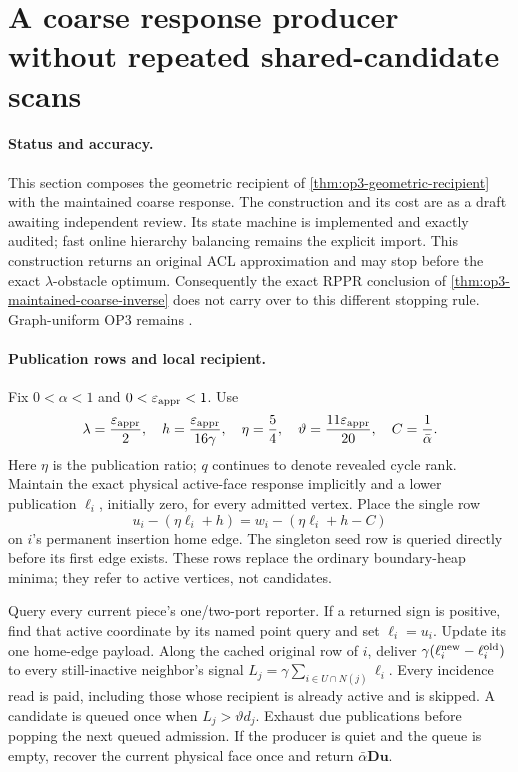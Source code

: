 \section[Coarse publication producer]{A coarse response producer without repeated shared-candidate scans}
\label{sec:op3-coarse-publications}

\paragraph{Status and accuracy.}
This section composes the geometric recipient of
\cref{thm:op3-geometric-recipient} with the maintained coarse response.
The construction and its cost are \statusproved{} as a draft awaiting
independent review. Its state machine is implemented and exactly audited;
fast online hierarchy balancing remains the explicit \statussource{}
import. This construction returns an original ACL approximation and may
stop before the exact $\lambda$-obstacle optimum. Consequently the exact
RPPR conclusion of \cref{thm:op3-maintained-coarse-inverse} does not carry
over to this different stopping rule. Graph-uniform OP3 remains
\statusopen{}.

\paragraph{Publication rows and local recipient.}
Fix $0<\alpha<1$ and $0<\varepsilon_{\mathrm{appr}}<1$. Use
\[
 \lambda=\frac{\varepsilon_{\mathrm{appr}}}{2},\quad
 h=\frac{\varepsilon_{\mathrm{appr}}}{16\gamma},\quad
 \eta=\frac54,\quad
 \vartheta=\frac{11\varepsilon_{\mathrm{appr}}}{20},\quad C=\frac1{\bar\alpha}.
\]
Here $\eta$ is the publication ratio; $q$ continues to denote revealed
cycle rank. Maintain the exact physical active-face response implicitly
and a lower publication $\ell_i$, initially zero, for every admitted vertex.
Place the single row
\begin{equation}
 u_i-(\eta\ell_i+h)
   =w_i-(\eta\ell_i+h-C)
 \label{eq:op3-producer-home-row}
\end{equation}
on $i$'s permanent insertion home edge. The singleton seed row is queried
directly before its first edge exists. These rows replace the ordinary
boundary-heap minima; they refer to active vertices, not candidates.

Query every current piece's one/two-port reporter. If a returned sign is
positive, find that active coordinate by its named point query and set
$\ell_i=u_i$. Update its one home-edge payload. Along the cached original
row of $i$, deliver $\gamma(\ell_i^{\rm new}-\ell_i^{\rm old})$ to every
still-inactive neighbor's signal
$L_j=\gamma\sum_{i\in U\cap N(j)}\ell_i$. Every incidence read is paid,
including those whose recipient is already active and is skipped. A
candidate is queued once when $L_j>\vartheta d_j$. Exhaust due publications
before popping the next queued admission. If the producer is quiet and
the queue is empty, recover the current physical face once and return
$\bar\alpha\boldsymbol D\boldsymbol u$.

